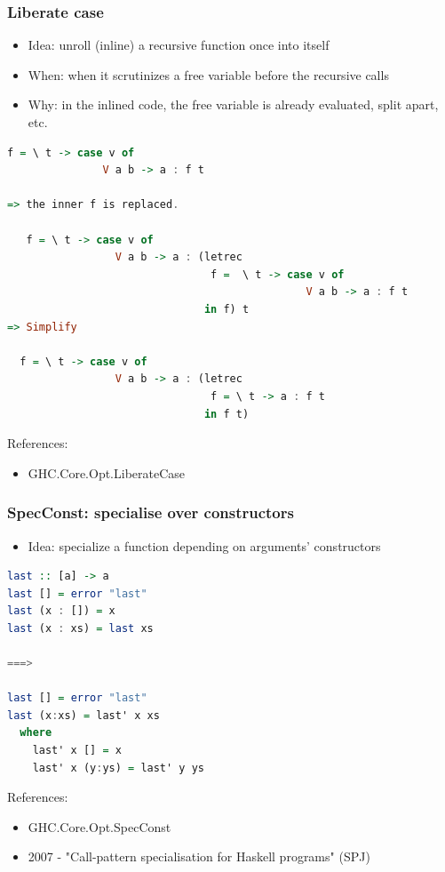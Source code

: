 \documentclass[aspectratio=169]{beamer}
\begin{document}
\begin{frame}[fragile]
  \frametitle{Liberate case}

  \begin{itemize}
    \item Idea: unroll (inline) a recursive function once into itself
    \item When: when it scrutinizes a free variable before the recursive calls
    \item Why: in the inlined code, the free variable is already evaluated,
      split apart, etc.
  \end{itemize}

  \begin{lstlisting}[language=haskell,basicstyle=\tiny]
   f = \ t -> case v of
               V a b -> a : f t

=> the inner f is replaced.

   f = \ t -> case v of
                 V a b -> a : (letrec
                                f =  \ t -> case v of
                                               V a b -> a : f t
                               in f) t
=> Simplify

  f = \ t -> case v of
                 V a b -> a : (letrec
                                f = \ t -> a : f t
                               in f t)
\end{lstlisting}


  References:
  \begin{itemize}
    \item GHC.Core.Opt.LiberateCase
  \end{itemize}
\end{frame}

\begin{frame}[fragile]
  \frametitle{SpecConst: specialise over constructors}

  \begin{itemize}
    \item Idea: specialize a function depending on arguments' constructors
  \end{itemize}

  \begin{lstlisting}[language=haskell,basicstyle=\tiny]
last :: [a] -> a
last [] = error "last"
last (x : []) = x
last (x : xs) = last xs

===>

last [] = error "last"
last (x:xs) = last' x xs
  where
    last' x [] = x
    last' x (y:ys) = last' y ys
  \end{lstlisting}

  References:
  \begin{itemize}
    \item GHC.Core.Opt.SpecConst
    \item 2007 - "Call-pattern specialisation for Haskell programs" (SPJ)
  \end{itemize}
\end{frame}
\end{document}
